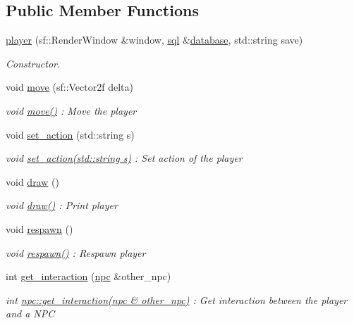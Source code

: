 \subsection*{Public Member Functions}
\begin{DoxyCompactItemize}
\item 
\hyperlink{classplayer_a1a369fcd087aa48f9241fb20c8df52f3}{player} (sf\+::\+Render\+Window \&window, \hyperlink{classsql}{sql} \&\hyperlink{classplayer_aa5560a5bdfc340ad6def011573ee5eb7}{database}, std\+::string save)
\begin{DoxyCompactList}\small\item\em Constructor. \end{DoxyCompactList}\item 
void \hyperlink{classplayer_a0f6538451ec51b4407cca22294451443}{move} (sf\+::\+Vector2f delta)
\begin{DoxyCompactList}\small\item\em void \hyperlink{classplayer_a0f6538451ec51b4407cca22294451443}{move()} \+: Move the player \end{DoxyCompactList}\item 
void \hyperlink{classplayer_aa673c84d7b56badc58d7c467325cbf88}{set\+\_\+action} (std\+::string s)
\begin{DoxyCompactList}\small\item\em void \hyperlink{classplayer_aa673c84d7b56badc58d7c467325cbf88}{set\+\_\+action(std\+::string s)} \+: Set action of the player \end{DoxyCompactList}\item 
void \hyperlink{classplayer_a67423ce10d4abb42775868f978d04247}{draw} ()
\begin{DoxyCompactList}\small\item\em void \hyperlink{classplayer_a67423ce10d4abb42775868f978d04247}{draw()} \+: Print player \end{DoxyCompactList}\item 
void \hyperlink{classplayer_a519784459639f6b785bcfeaa05b6f604}{respawn} ()
\begin{DoxyCompactList}\small\item\em void \hyperlink{classplayer_a519784459639f6b785bcfeaa05b6f604}{respawn()} \+: Respawn player \end{DoxyCompactList}\item 
int \hyperlink{classplayer_ad93507550867df5598b86b73de01ec12}{get\+\_\+interaction} (\hyperlink{classnpc}{npc} \&other\+\_\+npc)
\begin{DoxyCompactList}\small\item\em int \hyperlink{classnpc_a2714b410c2e644040f69f1cf50d3bc50}{npc\+::get\+\_\+interaction(npc \& other\+\_\+npc)} \+: Get interaction between the player and a N\+PC \end{DoxyCompactList}\item 

\end{DoxyCompactItemize}
